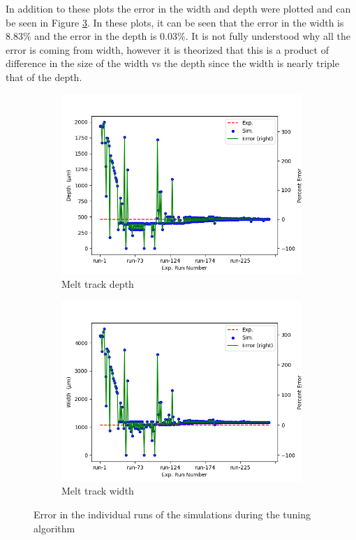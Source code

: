 \documentclass[pdflatex,sn-mathphys]{sn-jnl}
\begin{document}
	In addition to these plots the error in the width and depth were plotted and can be seen in Figure \ref{fig:tuning_error_complete}.  In these plots, it can be seen that the error in the width is 8.83\% and the error in the depth is 0.03\%.  It is not fully understood why all the error is coming from width, however it is theorized that this is a product of difference in the size of the width vs the depth since the width is nearly triple that of the depth.
	\begin{figure}[!htb]\centering
		\begin{subfigure}[c]{0.475\textwidth}\centering
		\includegraphics[width=\textwidth]{tuning_error_depth_complete}
		\caption{Melt track depth}
		\label{fig:tuning_error_depth_complete}
		\end{subfigure}\hfill{}
			\begin{subfigure}[c]{0.475\textwidth}\centering
			\includegraphics[width=\textwidth]{tuning_error_width_complete}
			\caption{Melt track width}
			\label{fig:tuning_error_width_complete}
			\end{subfigure}
		\caption{Error in the individual runs of the simulations during the tuning algorithm}
		\label{fig:tuning_error_complete}
	\end{figure}
	
\end{document}
